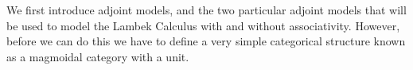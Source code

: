We first introduce adjoint models, and the two particular adjoint
models that will be used to model the Lambek Calculus with and without
associativity.  However, before we can do this we have to define a
very simple categorical structure known as a magmoidal category with a
unit.

